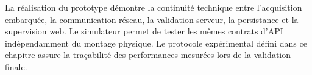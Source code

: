 La réalisation du prototype démontre la continuité technique entre
l'acquisition embarquée, la communication réseau, la validation serveur, la
persistance et la supervision web. Le simulateur permet de tester les mêmes
contrats d'API indépendamment du montage physique. Le protocole expérimental
défini dans ce chapitre assure la traçabilité des performances mesurées lors
de la validation finale.
\\
\\
\\
\\
\\
\\
\\
\\
\\
\\
\\
\\
\\
\\
\\
\\
